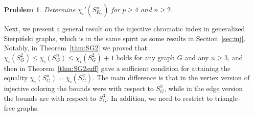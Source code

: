 \documentclass{article}
\newtheorem{problem}{Problem}
\begin{document}
\begin{problem}
Determine $\chi_i'(S_{K_p}^n)$ for $p\ge 4$ and $n\ge 2$.     
\end{problem}
  

Next, we present a general result on the injective chromatic index in generalized Sierpi\'{n}ski graphs, which is in the same spirit as some results in Section~\ref{sec:inj}. Notably, in Theorem~\ref{thm:SG2} we proved that $\chi_i(S_G^2)\le\chi_i(S_G^n)\le \chi_i(S_G^2)+1$ holds for any graph $G$ and any $n\ge 3$, and then in Theorem~\ref{thm:SG2suff} gave a sufficient condition for attaining the equality $\chi_i(S_G^n)=\chi_i(S_G^2)$. The main difference is that in the vertex version of injective coloring the bounds were with respect to $S_G^2$, while in the edge version the bounds are with respect to $S_G^3$. In addition, we need to restrict to triangle-free graphs. 
\end{document}

